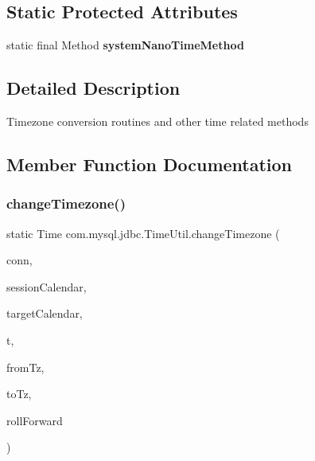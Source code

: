 \subsection*{Static Protected Attributes}
\begin{DoxyCompactItemize}
\item 
\mbox{\label{classcom_1_1mysql_1_1jdbc_1_1_time_util_ad810d8237d744fb54aa3881b82fef311}} 
static final Method {\bfseries system\+Nano\+Time\+Method}
\end{DoxyCompactItemize}


\subsection{Detailed Description}
Timezone conversion routines and other time related methods 

\subsection{Member Function Documentation}
\mbox{\label{classcom_1_1mysql_1_1jdbc_1_1_time_util_ad72309c404fe0fd1396ae37305bab486}} 
\subsubsection{\texorpdfstring{change\+Timezone()}{changeTimezone()}\hspace{0.1cm}{\footnotesize\ttfamily [1/2]}}
{\footnotesize\ttfamily static Time com.\+mysql.\+jdbc.\+Time\+Util.\+change\+Timezone (\begin{DoxyParamCaption}\item[{\mbox{\hyperlink{interfacecom_1_1mysql_1_1jdbc_1_1_my_s_q_l_connection}{My\+S\+Q\+L\+Connection}}}]{conn,  }\item[{Calendar}]{session\+Calendar,  }\item[{Calendar}]{target\+Calendar,  }\item[{Time}]{t,  }\item[{Time\+Zone}]{from\+Tz,  }\item[{Time\+Zone}]{to\+Tz,  }\item[{boolean}]{roll\+Forward }\end{DoxyParamCaption})\hspace{0.3cm}{\ttfamily [static]}}

